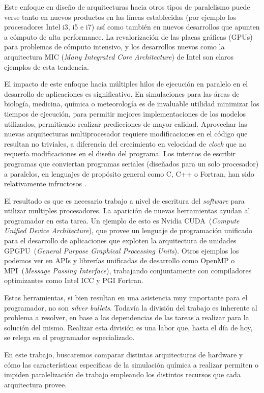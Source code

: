 Este enfoque en dise\~no de arquitecturas hacia otros tipos de paralelismo puede verse tanto en nuevos productos en las l\'ineas establecidas (por ejemplo los procesadores Intel i3, i5 e i7) as\'i como tambi\'en en nuevos desarrollos que apunten a c\'omputo de alta performance.
La revalorizaci\'on de las placas gr\'aficas (GPUs) para problemas de c\'omputo intensivo, y los desarrollos nuevos como la arquitectura MIC (\textit{Many Integrated Core Architecture}) de Intel son claros ejemplos de esta tendencia.

El impacto de este enfoque hacia m\'ultiples hilos de ejecuci\'on en paralelo en el desarrollo de aplicaciones es significativo. 
En simulaciones para las \'areas de biolog\'ia, medicina, qu\'imica o meteorolog\'ia es de invaluable utilidad minimizar los tiempos de ejecuci\'on, para permitir mejores implementaciones de los modelos utilizados, permitiendo realizar predicciones de mayor calidad. 
Aprovechar las nuevas arquitecturas multiprocesador requiere modificaciones en el c\'odigo que resultan no triviales, a diferencia del crecimiento en velocidad de \textit{clock} que no requer\'ia modificaciones en el dise\~no del programa. 
Los intentos de escribir programas que conviertan programas seriales (dise\~nados para un solo procesador) a paralelos, en lenguajes de prop\'osito general como C, C++ o Fortran, han sido relativamente infructosos .

El resultado es que es necesario trabajo a nivel de escritura del \textit{software} para utilizar multiples procesadores. 
La aparici\'on de nuevas herramientas ayudan al programador en esta tarea. 
Un ejemplo de esto es Nvidia CUDA~(\textit{Compute Unified Device Architecture}), que provee un lenguaje de programaci\'on unificado para el desarrollo de aplicaciones que exploten la arquitectura de unidades GPGPU~(\textit{General Purpose Graphical Processing Units}). 
Otros ejemplos los podemos ver en APIs y librer\'ias unificadas de desarrollo como OpenMP o MPI~(\textit{Message Passing Interface}), trabajando conjuntamente con compiladores
optimizantes como Intel ICC y PGI Fortran.

Estas herramientas, si bien resultan en una asistencia muy importante para el programador, no son \textit{silver bullets}. 
Todav\'ia la divisi\'on del trabajo es inherente al problema a resolver, en base a las dependencias de las tareas a realizar para la soluci\'on del mismo. 
Realizar esta divisi\'on es una labor que, hasta el d\'ia de hoy, se relega en el programador especializado.

En este trabajo, buscaremos comparar distintas arquitecturas de hardware y c\'omo las caracter\'isticas espec\'ificas de la simulaci\'on qu\'imica a realizar permiten o impiden paralelizaci\'on de trabajo empleando los distintos recursos que cada arquitectura provee.
